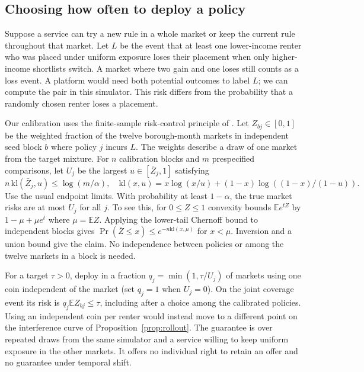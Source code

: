 \subsection{Choosing how often to deploy a policy}\label{sec:risk}
Suppose a service can try a new rule in a whole market or keep the current rule throughout that market. Let $L$ be the event that at least one lower-income renter who was placed under uniform exposure loses their placement when only higher-income shortlists switch. A market where two gain and one loses still counts as a loss event. A platform would need both potential outcomes to label $L$; we can compute the pair in this simulator. This risk differs from the probability that a randomly chosen renter loses a placement.

Our calibration uses the finite-sample risk-control principle of \citet{ltt,riskrec}. Let $Z_{bj}\in[0,1]$ be the weighted fraction of the twelve borough-month markets in independent seed block $b$ where policy $j$ incurs $L$. The weights describe a draw of one market from the target mixture. For $n$ calibration blocks and $m$ prespecified comparisons, let $U_j$ be the largest $u\in[\bar Z_j,1]$ satisfying
\[
 n\,\mathrm{kl}(\bar Z_j,u)\le\log(m/\alpha),
 \quad
 \mathrm{kl}(x,u)=x\log(x/u)+(1-x)\log((1-x)/(1-u)).
\]
Use the usual endpoint limits. With probability at least $1-\alpha$, the true market risks are at most $U_j$ for all $j$. To see this, for $0\le Z\le1$ convexity bounds $\mathbb E e^{tZ}$ by $1-\mu+\mu e^t$ where $\mu=\mathbb E Z$. Applying the lower-tail Chernoff bound to independent blocks gives $\Pr(\bar Z\le x)\le e^{-n\mathrm{kl}(x,\mu)}$ for $x<\mu$. Inversion and a union bound give the claim. No independence between policies or among the twelve markets in a block is needed.

For a target $\tau>0$, deploy in a fraction $q_j=\min(1,\tau/U_j)$ of markets using one coin independent of the market (set $q_j=1$ when $U_j=0$). On the joint coverage event its risk is $q_j\mathbb E Z_{bj}\le\tau$, including after a choice among the calibrated policies. Using an independent coin per renter would instead move to a different point on the interference curve of Proposition~\ref{prop:rollout}. The guarantee is over repeated draws from the same simulator and a service willing to keep uniform exposure in the other markets. It offers no individual right to retain an offer and no guarantee under temporal shift.
